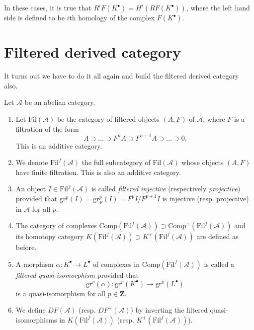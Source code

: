 \begin{remark}
\label{remark-cohomology-of-derived-functor}
In these cases, it is true that $R^iF(K^\bullet) = H^i(RF(K^\bullet))$, where
the left hand side is defined to be $i$th homology of the complex
$F(K^\bullet)$.
\end{remark}




\section{Filtered derived category}
\label{section-filtered-derived-category}

\noindent
It turns out we have to do it all again and build the filtered derived
category also.

\begin{definition}
\label{definition-filtered}
Let $\mathcal{A}$ be an abelian category.
\begin{enumerate}
\item Let $\text{Fil}(\mathcal{A})$ be the category of filtered objects
$(A, F)$ of $\mathcal{A}$, where $F$ is a filtration of the form
$$
A \supset \ldots \supset F^n A \supset F^{n+1}A \supset \ldots
\supset 0.
$$
This is an additive category.
\item We denote $\text{Fil}^f(\mathcal{A})$ the full
subcategory of $\text{Fil}(\mathcal{A})$ whose objects $(A, F)$ have finite
filtration. This is also an additive category.
\item An object $I \in \text{Fil}^f(\mathcal{A})$ is called
{\it filtered injective} (respectively {\it projective}) provided
that $\text{gr}^p(I) = \text{gr}_F^p(I) = F^pI/F^{p+1}I$ is injective
(resp. projective) in $\mathcal{A}$ for all $p$.
\item The category of complexes
$\text{Comp}(\text{Fil}^f(\mathcal{A})) \supset
\text{Comp}^+(\text{Fil}^f(\mathcal{A}))$
and its homotopy category
$K(\text{Fil}^f(\mathcal{A})) \supset K^+(\text{Fil}^f(\mathcal A))$
are defined as before.
\item A morphism $\alpha : K^\bullet \to L^\bullet$ of complexes in
$\text{Comp}(\text{Fil}^f(\mathcal{A}))$ is called a
{\it filtered quasi-isomorphism} provided that
$$
\text{gr}^p(\alpha): \text{gr}^p(K^\bullet) \to \text{gr}^p(L^\bullet)
$$
is a quasi-isomorphism for all $p \in \mathbf{Z}$.
\item We define $DF(\mathcal{A})$ (resp. $DF^+(\mathcal{A})$)
by inverting the filtered quasi-isomorphisms in
$K(\text{Fil}^f(\mathcal{A}))$ (resp. $K^+(\text{Fil}^f(\mathcal{A}))$).
\end{enumerate}
\end{definition}

